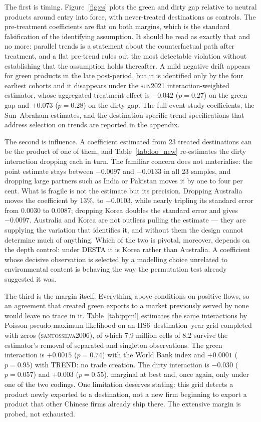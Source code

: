 \documentclass[11pt]{article}
\newcommand{\citep}[1]{(\textsc{#1})}
\newcommand{\citet}[1]{\textsc{#1}}
\begin{document}
The first is timing. Figure~\ref{fig:es} plots the green and dirty gap relative to neutral products
around entry into force, with never-treated destinations as controls. The pre-treatment coefficients
are flat on both margins, which is the standard falsification of the identifying assumption. It should
be read as exactly that and no more: parallel trends is a statement about the counterfactual path
after treatment, and a flat pre-trend rules out the most detectable violation without establishing
that the assumption holds thereafter. A mild negative drift appears for green products in the late
post-period, but it is identified only by the four earliest cohorts and it disappears under the
\citet{sun2021} interaction-weighted estimator, whose aggregated treatment effect is $-0.042$
($p = 0.27$) on the green gap and $+0.073$ ($p = 0.28$) on the dirty gap. The full event-study
coefficients, the Sun--Abraham estimates, and the destination-specific trend specifications that
address selection on trends are reported in the appendix.

The second is influence. A coefficient estimated from 23 treated destinations can be the product of
one of them, and Table~\ref{tab:loo_new} re-estimates the dirty interaction dropping each in turn. The
familiar concern does not materialise: the point estimate stays between $-0.0097$ and $-0.0133$ in all
23 samples, and dropping large partners such as India or Pakistan moves it by one to four per cent.
What is fragile is not the estimate but its precision. Dropping Australia moves the coefficient by
13\%, to $-0.0103$, while nearly tripling its standard error from 0.0030 to 0.0087; dropping Korea
doubles the standard error and gives $-0.0097$. Australia and Korea are not outliers pulling the
estimate --- they are supplying the variation that identifies it, and without them the design cannot
determine much of anything. Which of the two is pivotal, moreover, depends on the depth control:
under DESTA it is Korea rather than Australia. A coefficient whose decisive observation is selected by
a modelling choice unrelated to environmental content is behaving the way the permutation test
already suggested it was.

The third is the margin itself. Everything above conditions on positive flows, so an agreement that
created green exports to a market previously served by none would leave no trace in it.
Table~\ref{tab:ppml} estimates the same interactions by Poisson pseudo-maximum likelihood on an
HS6--destination--year grid completed with zeros \citep{santossilva2006}, of which 7.9 million cells
of 8.2 survive the estimator's removal of separated and singleton observations. The green interaction
is $+0.0015$ ($p = 0.74$) with the World Bank index and $+0.0001$ ($p = 0.95$) with TREND: no trade
creation. The dirty interaction is $-0.030$ ($p = 0.057$) and $+0.003$ ($p = 0.55$), marginal at best
and, once again, only under one of the two codings. One limitation deserves stating: this grid detects
a product newly exported to a destination, not a new firm beginning to export a product that other
Chinese firms already ship there. The extensive margin is probed, not exhausted.
\end{document}
